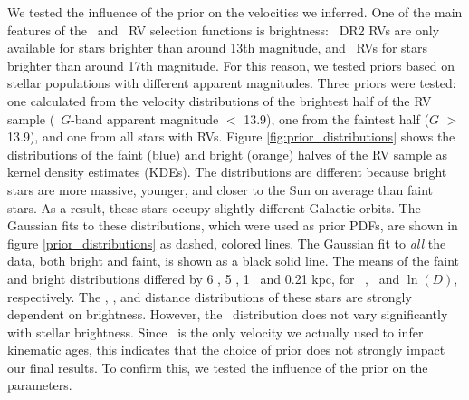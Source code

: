 We tested the influence of the prior on the velocities we inferred.
One of the main features of the \gaia\ and \lamost\ RV selection functions is
brightness: \gaia\ DR2 RVs are only available for stars brighter than around
13th magnitude, and \lamost\ RVs for stars brighter than around 17th
magnitude.
For this reason, we tested priors based on stellar populations with different
apparent magnitudes.
Three priors were tested: one calculated from the velocity distributions of
the brightest half of the RV sample (\gaia\ $G$-band apparent magnitude $<$
13.9), one from the faintest half ($G$ $>$ 13.9), and one from all stars with
RVs.
Figure \ref{fig:prior_distributions} shows the distributions of the faint
(blue) and bright (orange) halves of the RV sample as kernel density estimates
(KDEs).
The distributions are different because bright stars are more massive,
younger, and closer to the Sun on average than faint stars.
As a result, these stars occupy slightly different Galactic orbits.
The Gaussian fits to these distributions, which were used as prior PDFs, are
shown in figure \ref{prior_distributions} as dashed, colored lines.
The Gaussian fit to {\it all} the data, both bright and faint, is shown as a
black solid line.
The means of the faint and bright distributions differed by 6 \kms, 5 \kms, 1
\kms\ and 0.21 kpc, for \vx\, \vy, \vz\ and $\ln(D)$, respectively.
The \vx, \vy, and distance distributions of these stars are strongly dependent
on brightness.
However, the \vz\ distribution does not vary significantly with stellar
brightness.
Since \vz\ is the only velocity we actually used to infer kinematic ages, this
indicates that the choice of prior does not strongly impact our final results.
To confirm this, we tested the influence of the prior on the parameters.

